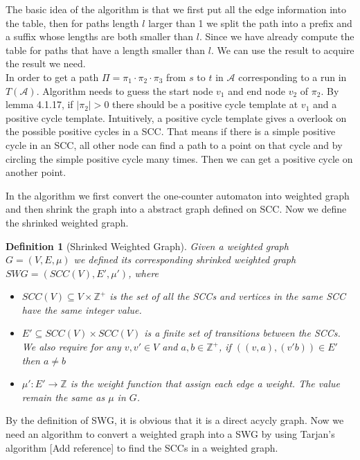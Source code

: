 \documentclass[12pt]{article}
\newtheorem{definition}{Definition}
\begin{document}
The basic idea of the algorithm is that we first put all the edge information into the table, then for paths length $l$ larger than 1 we split the path into a prefix and a suffix  whose lengths are both smaller than $l$. Since we have already compute the table for paths that have a length smaller than $l$. We can use the result to acquire the result we need.\\



In order to get a path $\Pi= \pi_1\cdot \pi_2 \cdot \pi_3$ from $s$ to $t$ in   $\mathcal{A}$ corresponding to a run in $T(\mathcal{A})$. Algorithm needs to guess the start node $v_1$ and end node $v_2$ of $\pi_2$. By lemma 4.1.17, if $|\pi_2| > 0$ there should be a  positive cycle template at $v_1$ and a positive cycle template. Intuitively, a positive cycle template gives a overlook on the possible positive cycles in a SCC. That means if there is a simple positive cycle in an SCC, all other node can find a path to a point on that cycle and by circling the simple positive cycle many times. Then we can get a positive cycle on another point.

In the algorithm we first convert the one-counter automaton into weighted graph and then shrink the graph into a abstract graph defined on SCC. Now we define the shrinked weighted graph.

\begin{definition}[Shrinked Weighted Graph]
Given a weighted graph $G = (V, E, \mu)$ we defined its corresponding shrinked weighted graph $SWG = (SCC(V), E', \mu')$, where
\begin{itemize}
\item $SCC(V) \subseteq V\times \mathbb{Z}^+$ is the set of all the SCCs and vertices in the same SCC have the same integer value.

\item $E'\subseteq SCC(V) \times SCC(V)$ is a finite set of transitions between the SCCs. We also require for any $v,v'\in V$ and $a,b \in \mathbb{Z}^+$, if $((v,a), (v'b)) \in E'$ then $a \ne b$

\item $\mu': E' \rightarrow \mathbb{Z}$ is the weight function that assign each edge a weight. The value remain the same as $\mu$ in $G$.
\end{itemize}

\end{definition}

By the definition of SWG, it is obvious that it is a direct acycly graph. Now we need an algorithm to convert a weighted graph into a SWG by using Tarjan's algorithm [Add reference] to find the SCCs in a weighted graph.
\end{document}
